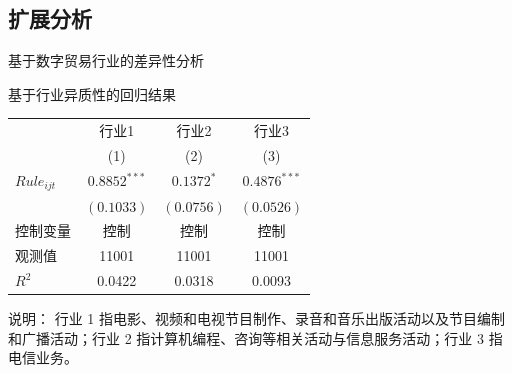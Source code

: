 \documentclass{beamer}
\newcommand{\zhhei}{\CJKfamily{zhhei}}  %
\begin{document}
\subsection{扩展分析}
\begin{frame}{基于数字贸易行业的差异性分析}
    \centering
    \begin{threeparttable}
        \caption{基于行业异质性的回归结果}
        \begin{tabular}{lccc}
            \toprule
            & 行业1 & 行业2 & 行业3 \\
            & (1) & (2) & (3) \\
            \midrule
            $Rule_{ijt}$ & $0.8852^{***}$ & $0.1372^{*}$ & $0.4876^{***}$ \\
            & $(0.1033)$ & $(0.0756)$ & $(0.0526)$ \\
            控制变量 & 控制 & 控制 & 控制 \\
            观测值 & 11001 & 11001 & 11001 \\
            $R^2$ & 0.0422 & 0.0318 & 0.0093 \\
            \bottomrule
        \end{tabular}
        \begin{tablenotes}
            \begin{footnotesize}
                \item {\zhhei 说明：} 行业 1 指电影、视频和电视节目制作、录音和音乐出版活动以及节目编制和广播活动；行业 2 指计算机编程、咨询等相关活动与信息服务活动；行业 3 指电信业务。
            \end{footnotesize}
        \end{tablenotes}
    \end{threeparttable}
\end{frame}
\end{document}
